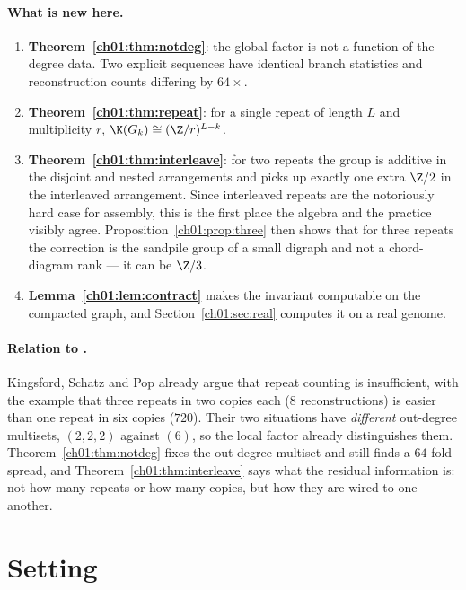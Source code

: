\paragraph{What is new here.}
\begin{enumerate}
\item[(i)] \textbf{Theorem~\ref{ch01:thm:notdeg}}: the global factor is not a function of the
degree data. Two explicit sequences have identical branch statistics and reconstruction
counts differing by $64\times$.
\item[(ii)] \textbf{Theorem~\ref{ch01:thm:repeat}}: for a single repeat of length $L$ and
multiplicity $r$, $\K(G_k)\cong(\Z/r)^{L-k}$.
\item[(iii)] \textbf{Theorem~\ref{ch01:thm:interleave}}: for two repeats
the group is additive in the disjoint and nested arrangements and picks up exactly one
extra $\Z/2$ in the interleaved arrangement. Since interleaved repeats are the notoriously
hard case for assembly, this is the first place the algebra and the practice visibly
agree. Proposition~\ref{ch01:prop:three} then shows that for three repeats the correction is
the sandpile group of a small digraph and not a chord-diagram rank --- it can be $\Z/3$.
\item[(iv)] \textbf{Lemma~\ref{ch01:lem:contract}} makes the invariant computable on the
compacted graph, and Section~\ref{ch01:sec:real} computes it on a real genome.
\end{enumerate}

\paragraph{Relation to \cite{KSP}.}
Kingsford, Schatz and Pop already argue that repeat counting is insufficient, with the
example that three repeats in two copies each ($8$ reconstructions) is easier than one
repeat in six copies ($720$). Their two situations have \emph{different} out-degree
multisets, $(2,2,2)$ against $(6)$, so the local factor already distinguishes them.
Theorem~\ref{ch01:thm:notdeg} fixes the out-degree multiset and still finds a $64$-fold spread,
and Theorem~\ref{ch01:thm:interleave} says what the residual information is: not how many
repeats or how many copies, but how they are wired to one another.

\section{Setting}\label{ch01:sec:setting}

